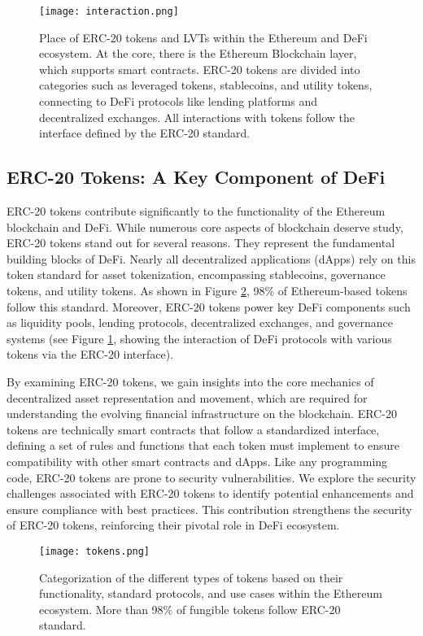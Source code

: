 \begin{figure}[t]
	\centering
	\texttt{[image: interaction.png]}
	\caption[The Ethereum and DeFi ecosystem.]{Place of ERC-20 tokens and LVTs within the Ethereum and DeFi ecosystem. At the core, there is the Ethereum Blockchain layer, which supports smart contracts. ERC-20 tokens are divided into categories such as leveraged tokens, stablecoins, and utility tokens, connecting to DeFi protocols like lending platforms and decentralized exchanges. All interactions with tokens follow the interface defined by the ERC-20 standard.}
	\label{fig:interaction}
\end{figure}

\subsection*{ERC-20 Tokens: A Key Component of DeFi}
ERC-20 tokens contribute significantly to the functionality of the Ethereum blockchain and DeFi. While numerous core aspects of blockchain deserve study, ERC-20 tokens stand out for several reasons. They represent the fundamental building blocks of DeFi. Nearly all decentralized applications (dApps) rely on this token standard for asset tokenization, encompassing stablecoins, governance tokens, and utility tokens. As shown in Figure \ref{fig:tokens}, 98\% of Ethereum-based tokens follow this standard. Moreover, ERC-20 tokens power key DeFi components such as liquidity pools, lending protocols, decentralized exchanges, and governance systems (see Figure \ref{fig:interaction}, showing the interaction of DeFi protocols with various tokens via the ERC-20 interface). 

By examining ERC-20 tokens, we gain insights into the core mechanics of decentralized asset representation and movement, which are required for understanding the evolving financial infrastructure on the blockchain. ERC-20 tokens are technically smart contracts that follow a standardized interface, defining a set of rules and functions that each token must implement to ensure compatibility with other smart contracts and dApps. Like any programming code, ERC-20 tokens are prone to security vulnerabilities. We explore the security challenges associated with ERC-20 tokens to identify potential enhancements and ensure compliance with best practices. This contribution strengthens the security of ERC-20 tokens, reinforcing their pivotal role in DeFi ecosystem.

\begin{figure}[t]
	\centering
	\texttt{[image: tokens.png]}
	\caption[Categorization of the different types of tokens.]{Categorization of the different types of tokens based on their functionality, standard protocols, and use cases within the Ethereum ecosystem. More than 98\% of fungible tokens follow ERC-20 standard.}
	\label{fig:tokens}
\end{figure}

